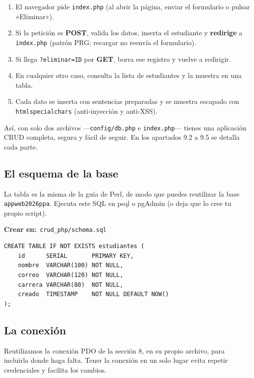 \documentclass[11pt]{article}
\begin{document}
\begin{enumerate}[leftmargin=1.7em,itemsep=3pt,topsep=2pt]
\item El navegador pide \texttt{index.\allowbreak{}php} (al abrir la página, enviar el formulario o pulsar «Eliminar»).
\item Si la petición es \textbf{POST}, valida los datos, inserta el estudiante y \textbf{redirige} a \texttt{index.\allowbreak{}php} (patrón PRG: recargar no reenvía el formulario).
\item Si llega \texttt{?\allowbreak{}eliminar=\allowbreak{}ID} por \textbf{GET}, borra ese registro y vuelve a redirigir.
\item En cualquier otro caso, consulta la lista de estudiantes y la muestra en una tabla.
\item Cada dato se inserta con sentencias preparadas y se muestra escapado con \texttt{htmlspecialchars} (anti-inyección y anti-XSS).
\end{enumerate}
Así, con solo dos archivos —\texttt{config/\allowbreak{}db.\allowbreak{}php} e \texttt{index.\allowbreak{}php}— tienes una aplicación CRUD completa, segura y fácil de seguir. En los apartados 9.2 a 9.5 se detalla cada parte.

\subsection{El esquema de la base}
La tabla es la misma de la guía de Perl, de modo que puedes reutilizar la base \texttt{appweb2026ppa}. Ejecuta este SQL en psql o pgAdmin (o deja que lo cree tu propio script).

{\small\color{phpazulo}\textbf{Crear en:}~}\texttt{crud\_php/\allowbreak{}schema.\allowbreak{}sql}\par\nobreak\vspace{-1pt}
\begin{cajacodigo}
\begin{lstlisting}[style=sql]
CREATE TABLE IF NOT EXISTS estudiantes (
    id      SERIAL       PRIMARY KEY,
    nombre  VARCHAR(100) NOT NULL,
    correo  VARCHAR(120) NOT NULL,
    carrera VARCHAR(80)  NOT NULL,
    creado  TIMESTAMP    NOT NULL DEFAULT NOW()
);
\end{lstlisting}
\end{cajacodigo}
\vspace{2pt}
\subsection{La conexión}
Reutilizamos la conexión PDO de la sección 8, en su propio archivo, para incluirla donde haga falta. Tener la conexión en un solo lugar evita repetir credenciales y facilita los cambios.
\end{document}
